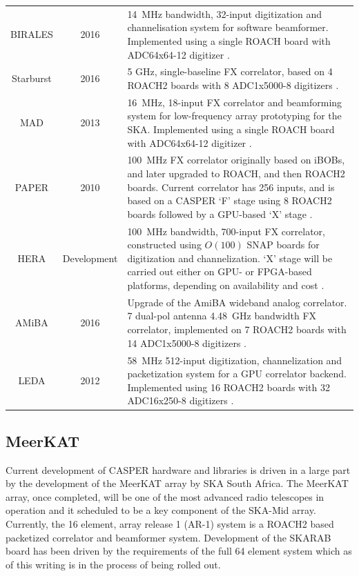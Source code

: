 \documentclass{ws-jai}
\begin{document}
\begin{table}
\begin{tabular}{ccp{10cm}}
  BIRALES          & 2016 & 14~MHz bandwidth, 32-input digitization and channelisation system for software beamformer. Implemented using a single ROACH board with ADC64x64-12 digitizer \citep{7180719}. \\
  Starburst        & 2016 & 5 GHz, single-baseline FX correlator, based on 4 ROACH2 boards with 8 ADC1x5000-8 digitizers \citep{Monroe, private comm}. \\
  MAD              & 2013 & 16~MHz, 18-input FX correlator and beamforming system for low-frequency array prototyping for the SKA. Implemented using a single ROACH board with ADC64x64-12 digitizer \citep{Pupillo2015, RDS:RDS20336}. \\
  PAPER            & 2010 & 100~MHz FX correlator originally based on iBOBs, and later upgraded to ROACH, and then ROACH2 boards. Current correlator has 256 inputs, and is based on a CASPER `F' stage using 8 ROACH2 boards followed by a GPU-based `X' stage \citep{2010AJ....139.1468P, 2014ApJ...788..106P, 2015ApJ...809...61A}. \\
  HERA             & Development & 100~MHz bandwidth, 700-input FX correlator, constructed using $O(100)$ SNAP boards for digitization and channelization. `X' stage will be carried out either on GPU- or FPGA-based platforms, depending on availability and cost \citep{2016arXiv160607473D}. \\
  AMiBA            & 2016 & Upgrade of the AmiBA wideband analog correlator. 7 dual-pol antenna 4.48~GHz bandwidth FX correlator, implemented on 7 ROACH2 boards with 14 ADC1x5000-8 digitizers \citep{amiba-adc, amiba-interim}. \\
  LEDA             & 2012 & 58~MHz 512-input digitization, channelization and packetization system for a GPU correlator backend. Implemented using 16 ROACH2 boards with 32 ADC16x250-8 digitizers \citep{doi:10.1142/S2251171715500038}.\\
  \hline
\end{tabular}
\end{table}


\subsection{MeerKAT}

Current development of CASPER hardware and libraries is driven in a large part
by the development of the MeerKAT array by SKA South Africa. The MeerKAT array,
once completed, will be one of the most advanced radio telescopes in operation
and it scheduled to be a key component of the SKA-Mid array. Currently, the 16
element, array release 1 (AR-1) system is a ROACH2 based packetized correlator
and beamformer system. Development of the SKARAB board has been driven by the
requirements of the full 64 element system which as of this writing is in the
process of being rolled out. 
\end{document}
